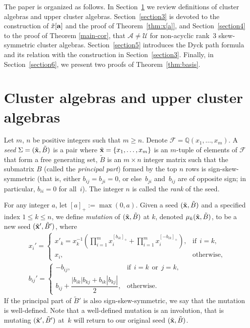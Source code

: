\documentclass[pdftex]{sigma}
\numberwithin{equation}{section}
\begin{document}
The paper is organized as follows. In Section~\ref{section2} we review def\/initions of cluster algebras and upper cluster algebras. Section~\ref{section3} is devoted to the construction of $\tilde{x}[{\bf a}]$ and the proof of Theorem~\ref{thm:x[a]}, and Section~\ref{section4} to the proof of
Theorem \ref{main-cor}, that $\mathcal{A}\neq \mathcal{U}$ for non-acyclic rank~3 skew-symmetric cluster algebras. Section~\ref{section5} introduces the Dyck path formula and its relation with the construction in Section~\ref{section3}. Finally, in Section~\ref{section6}, we present two proofs of Theorem~\ref{thm:basis}.

\section{Cluster algebras and upper cluster algebras}\label{section2}

Let $m$, $n$ be positive integers such that $m\geq n$. Denote $\mathcal{F}=\mathbb{Q}(x_1,\dots,x_m)$.
A \emph{seed}  $\Sigma=(\tilde{\bf x},\tilde{B})$ is a pair where $\tilde{\bf x}=\{x_1,\ldots,x_m\}$ is an $m$-tuple of elements of $\mathcal{F}$ that form a free generating set, $\tilde{B}$ is an $m\times n$ integer matrix such that the submatrix $B$  (called the \emph{principal part}) formed by the top $n$ rows is sign-skew-symmetric (that is, either $b_{ij}=b_{ji}=0$, or else~$b_{ji}$ and~$b_{ij} $ are of opposite sign; in particular, $b_{ii}=0$ for all~$i$).
The integer $n$ is called the \emph{rank} of the seed.

For any integer $a$, let $[a]_+:= \max(0,a)$.
 Given a seed $(\tilde{\bf x},\tilde{B})$ and a specif\/ied index $1\leq k \leq n$, we def\/ine \emph{mutation} of $(\tilde{\bf x},\tilde{B})$ at $k$, denoted $\mu_{k}(\tilde{\bf x},\tilde{B})$, to be a new seed $(\tilde{\bf x}',\tilde{B}')$, where
\begin{gather*}
 x_i' = \begin{cases}
\displaystyle  x'_k=x_k^{-1}\left(\prod\limits_{i=1}^{m}x_i^{[b_{ik}]_+}+\prod\limits_{i=1}^{m}x_i^{[-b_{ik}]_+}\right),
  & \mbox{if} \ \  i=k, \\
x_i, & \mbox{otherwise}, \end{cases}\\
b_{ij}' = \begin{cases} -b_{ij}, & \mbox{if} \ \ i=k \ \ \text{or} \ \ j=k,  \\
b_{ij} + \dfrac{|b_{ik}|b_{kj} + b_{ik}|b_{kj}|}{2}, & \mbox{otherwise.}
\end{cases}
\end{gather*}
If the principal part of $\tilde{B}'$ is also sign-skew-symmetric, we say that the mutation is well-def\/ined.
Note that a well-def\/ined mutation is an involution, that is mutating $(\tilde{\bf x}', \tilde{B}')$ at~$k$ will return to our original seed $(\tilde{\bf x}, \tilde{B})$.
\end{document}
